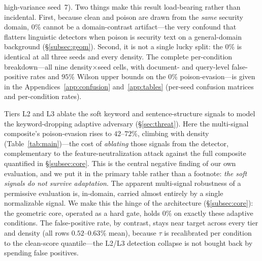 \documentclass[10pt,journal,compsoc]{IEEEtran}
\begin{document}
high-variance seed~7).
Two things make this result load-bearing rather than incidental. First, because
clean and poison are drawn from the \emph{same} security domain, $0\%$ cannot be a
domain-contrast artifact---the very confound that flatters linguistic detectors
when poison is security text on a general-domain background (\S\ref{subsec:geom}).
Second, it is not a single lucky split: the $0\%$ is identical at all three seeds
and every density. The complete per-condition breakdown---all nine
density$\times$seed cells, with document- and query-level false-positive rates and
$95\%$ Wilson upper bounds on the $0\%$ poison-evasion---is given in the
Appendices~\ref{app:confusion} and~\ref{app:tables} (per-seed confusion matrices and per-condition rates).

Tiers L2 and L3 ablate the soft keyword and sentence-structure signals to model
the keyword-dropping adaptive adversary (\S\ref{sec:threat}). Here the multi-signal
composite's poison-evasion rises to $42$--$72\%$, climbing with density
(Table~\ref{tab:main})---the cost of \emph{ablating} those signals from the detector,
complementary to the feature-neutralization attack against the full composite quantified
in \S\ref{subsec:core}.
This is the central negative finding of our own evaluation, and we put it in the
primary table rather than a footnote: \emph{the soft signals do not survive
adaptation}. The apparent multi-signal robustness of a permissive evaluation is,
in-domain, carried almost entirely by a single normalizable signal. We make this
the hinge of the architecture (\S\ref{subsec:core}): the geometric core, operated
as a hard gate, holds $0\%$ on exactly these adaptive conditions. The
false-positive rate, by contrast, stays near target across every tier and density
(all rows $0.52$--$0.63\%$ mean), because $\tau$ is recalibrated per condition to
the clean-score quantile---the L2/L3 detection collapse is not bought back by
spending false positives.
\end{document}
